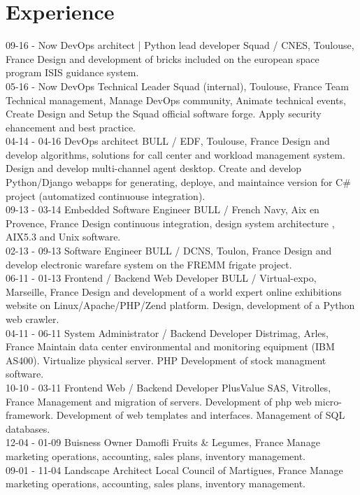 \documentclass[]{friggeri-cv}
\begin{document}
\section{Experience}
\begin{entrylist}
    \entry
        {09-16 - Now}
        {DevOps architect | Python lead developer}
        {Squad / CNES, Toulouse, France}
        {Design and development of bricks included on the european space program ISIS guidance system.\\}
    \entry
        {05-16 - Now}
        {DevOps Technical Leader}
        {Squad (internal), Toulouse, France}
        {Team Technical management, Manage DevOps community, Animate technical events, Create Design and Setup the Squad official software forge. Apply security ehancement and best practice.\\}
    \entry
        {04-14 - 04-16}
        {DevOps architect}
        {BULL / EDF, Toulouse, France}
        {Design and develop algorithms, solutions for call center and workload management system. Design and develop multi-channel agent desktop.
        Create and develop Python/Django webapps for generating, deploye, and maintaince version for C\# project (automatized continuouse integration).\\}
    \entry
        {09-13 - 03-14}
        {Embedded Software Engineer}
        {BULL / French Navy, Aix en Provence, France}
        {Design continuous integration, design system architecture , AIX5.3 and Unix software.\\}
    \entry
        {02-13 - 09-13}
        {Software Engineer}
        {BULL / DCNS, Toulon, France}
        {Design and develop electronic warefare system on the FREMM frigate project.\\}
    \entry
        {06-11 - 01-13}
        {Frontend / Backend Web Developer}
        {BULL / Virtual-expo, Marseille, France}
        {Design and development of a world expert online exhibitions website on Linux/Apache/PHP/Zend platform. Design, development of a Python web crawler.\\}
    \entry
        {04-11 - 06-11}
        {System Administrator / Backend Developer}
        {Distrimag, Arles, France}
        {Maintain data center environmental and monitoring equipment (IBM AS400). Virtualize physical server. PHP Development of stock managment software.\\}
    \entry
        {10-10 - 03-11}
        {Frontend Web / Backend Developer}
        {PlusValue SAS, Vitrolles, France}
        {Management and migration of servers. Development of php web micro-framework. Development of web templates and interfaces. Management of SQL databases.\\}
    \entry
        {12-04 - 01-09}
        {Buisness Owner}
        {Damofli Fruits \& Legumes, France}
        {Manage marketing operations, accounting, sales plans, inventory management.\\}
    \entry
        {09-01 - 11-04}
        {Landscape Architect}
        {Local Council of Martigues, France}
        {Manage marketing operations, accounting, sales plans, inventory management.\\}
\end{entrylist}
\end{document}
